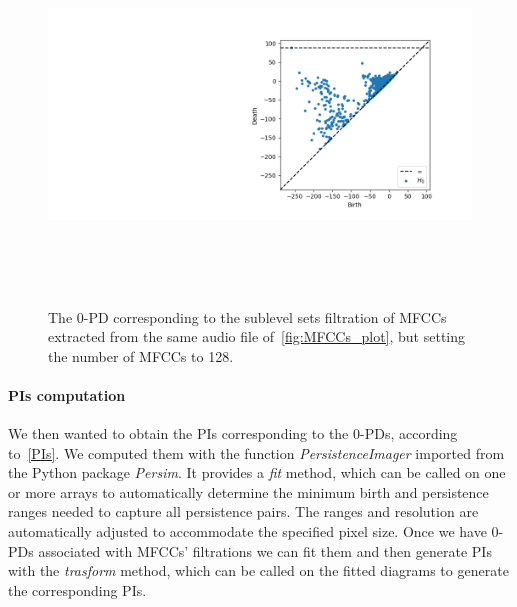 \documentclass[english, LaM, oneside, noexaminfo]{sapthesis}
\begin{document}
\begin{figure}[tb]
\advance\leftskip-8cm
\includegraphics[height=10cm]{0-PD.png}
\caption{The $0$-PD corresponding to the sublevel sets filtration of MFCCs extracted from the same audio file of~\cref{fig:MFCCs_plot}, but setting the number of MFCCs to 128.}\label{fig:0-PD}
\end{figure}

\paragraph{PIs computation} We then wanted to obtain the PIs corresponding to the $0$-PDs, according to~\cref{PIs}. We computed them with the function \textit{PersistenceImager} imported from the Python package \textit{Persim}. It provides a \textit{fit} method, which can be called on one or more arrays to automatically determine the minimum birth and persistence ranges needed to capture all persistence pairs. The ranges and resolution are automatically adjusted to accommodate the specified pixel size. Once we have $0$-PDs associated with MFCCs’ filtrations we can fit them and then generate PIs with the \textit{trasform} method, which can be called on the fitted diagrams to generate the corresponding PIs.
\end{document}
